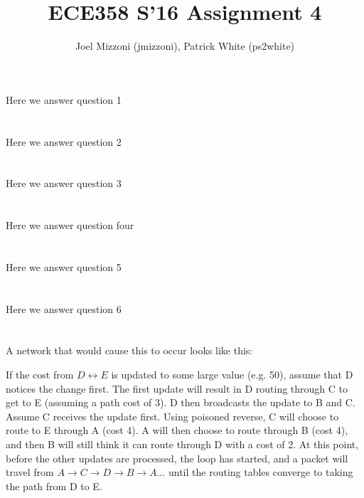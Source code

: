 \documentclass[10pt,a4paper]{article}
\author{Joel Mizzoni (jmizzoni), Patrick White (ps2white)}
\begin{document}
\title{ECE358 S'16 Assignment 4}
\maketitle
\section{}
Here we answer question 1
\section{}
Here we answer question 2
\section{}
Here we answer question 3
\section{}
Here we answer question four
\section{}
Here we answer question 5
\section{}
Here we answer question 6
\section{}
A network that would cause this to occur looks like this:

If the cost from $D \leftrightarrow E$ is updated to some large value (e.g. 50), assume that D notices the change first.
The first update will result in D routing through C to get to E (assuming a path cost of 3). D then broadcasts the update to B and C.
Assume C receives the update first. Using poisoned reverse, C will choose to route to E through A (cost 4). 
A will then choose to route through B (cost 4), and then B will still think it can route through D with a cost of 2.
At this point, before the other updates are processed, the loop has started, and a packet will travel from $A \rightarrow C \rightarrow D \rightarrow B \rightarrow A \ldots$ until the routing tables converge to taking the path from D to E.
\end{document}

